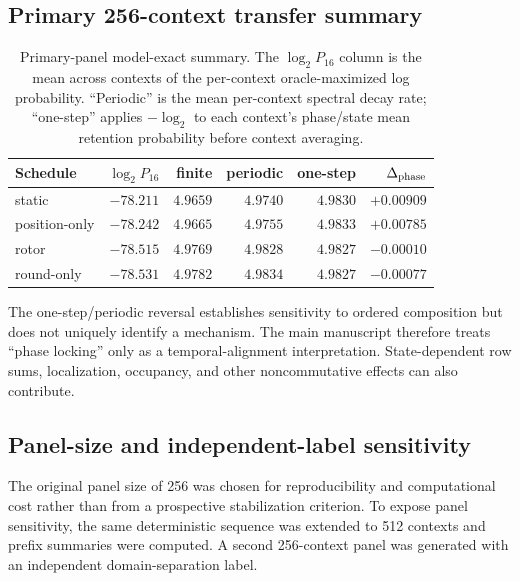 \documentclass[cryptography,supfile,submit,oneauthor]{Definitions/mdpi}
\begin{document}
\subsection{Primary 256-context transfer summary}
\begin{table}[h]
\centering\small
\caption{Primary-panel model-exact summary. The $\log_2 P_{16}$ column is the mean across contexts of the per-context oracle-maximized log probability. ``Periodic'' is the mean per-context spectral decay rate; ``one-step'' applies $-\log_2$ to each context's phase/state mean retention probability before context averaging.}
\begin{tabular}{lrrrrr}
\toprule
Schedule & $\log_2 P_{16}$ & finite & periodic & one-step & $\Delta_{\rm phase}$\\
\midrule
static & $-78.211$ & $4.9659$ & $4.9740$ & $4.9830$ & $+0.00909$\\
position-only & $-78.242$ & $4.9665$ & $4.9755$ & $4.9833$ & $+0.00785$\\
rotor & $-78.515$ & $4.9769$ & $4.9828$ & $4.9827$ & $-0.00010$\\
round-only & $-78.531$ & $4.9782$ & $4.9834$ & $4.9827$ & $-0.00077$\\
\bottomrule
\end{tabular}
\end{table}

The one-step/periodic reversal establishes sensitivity to ordered composition but does not uniquely identify a mechanism. The main manuscript therefore treats ``phase locking'' only as a temporal-alignment interpretation. State-dependent row sums, localization, occupancy, and other noncommutative effects can also contribute.

\subsection{Panel-size and independent-label sensitivity}
The original panel size of 256 was chosen for reproducibility and computational cost rather than from a prospective stabilization criterion. To expose panel sensitivity, the same deterministic sequence was extended to 512 contexts and prefix summaries were computed. A second 256-context panel was generated with an independent domain-separation label.
\end{document}
